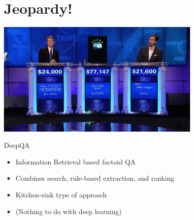\documentclass{beamer}
\begin{document}
{

}


{

}



{

}

{

}



{

}



\section{Jeopardy!}

\begin{frame}
  \begin{center}
    \includegraphics[width=10cm]{IBMwatson}
  \end{center}
\end{frame}

\begin{frame}{DeepQA}
  \begin{itemize}
  \item Information Retrieval based factoid QA
    \air 
  \item Combines search, rule-based extraction, and ranking 
    \air 
  \item Kitchen-sink type of approach
    \air 

  \item (Nothing to do with deep learning)
  \end{itemize}
\end{frame}
\end{document}

